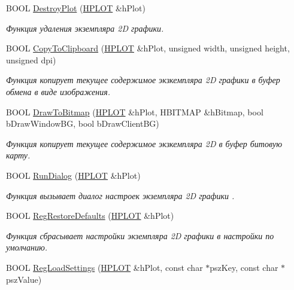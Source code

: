\begin{DoxyCompactItemize}
B\-O\-O\-L \hyperlink{group__group1_gaa1d4729bae2ddfd134d72fcab62930d5}{Destroy\-Plot} (\hyperlink{classxyplot_1_1_h_p_l_o_t}{H\-P\-L\-O\-T} \&h\-Plot)
\begin{DoxyCompactList}\small\item\em Функция удаления экземпляра 2\-D графики. \end{DoxyCompactList}\item 
B\-O\-O\-L \hyperlink{classxyplot_1_1_x_y_plot_manager_a3e8a430da4df94af8575d388064f21df}{Copy\-To\-Clipboard} (\hyperlink{classxyplot_1_1_h_p_l_o_t}{H\-P\-L\-O\-T} \&h\-Plot, unsigned width, unsigned height, unsigned dpi)
\begin{DoxyCompactList}\small\item\em Функция копирует текущее содержимое экзкемпляра 2\-D графики в буфер обмена в виде изображения. \end{DoxyCompactList}\item 
B\-O\-O\-L \hyperlink{classxyplot_1_1_x_y_plot_manager_a056c90eb93b99097d2514177b0b993b5}{Draw\-To\-Bitmap} (\hyperlink{classxyplot_1_1_h_p_l_o_t}{H\-P\-L\-O\-T} \&h\-Plot, H\-B\-I\-T\-M\-A\-P \&h\-Bitmap, bool b\-Draw\-Window\-B\-G, bool b\-Draw\-Client\-B\-G)
\begin{DoxyCompactList}\small\item\em Функция копирует текущее содержимое экзкемпляра 2\-D в буфер битовую карту. \end{DoxyCompactList}\item 
B\-O\-O\-L \hyperlink{classxyplot_1_1_x_y_plot_manager_a1c9425d25c34fc173ef0367a2ef9eb74}{Run\-Dialog} (\hyperlink{classxyplot_1_1_h_p_l_o_t}{H\-P\-L\-O\-T} \&h\-Plot)
\begin{DoxyCompactList}\small\item\em Функция вызывает диалог настроек экземпляра 2\-D графики . \end{DoxyCompactList}\item 
B\-O\-O\-L \hyperlink{group__gr_properties_ga86742bc6603db4141caaee586872e5df}{Reg\-Restore\-Defaults} (\hyperlink{classxyplot_1_1_h_p_l_o_t}{H\-P\-L\-O\-T} \&h\-Plot)
\begin{DoxyCompactList}\small\item\em Функция сбрасывает настройки экземпляра 2\-D графики в настройки по умолчанию. \end{DoxyCompactList}\item 
B\-O\-O\-L \hyperlink{group__gr_properties_ga24942314b181fa7f547629d15577589d}{Reg\-Load\-Settings} (\hyperlink{classxyplot_1_1_h_p_l_o_t}{H\-P\-L\-O\-T} \&h\-Plot, const char $\ast$psz\-Key, const char $\ast$psz\-Value)

\end{DoxyCompactItemize}
